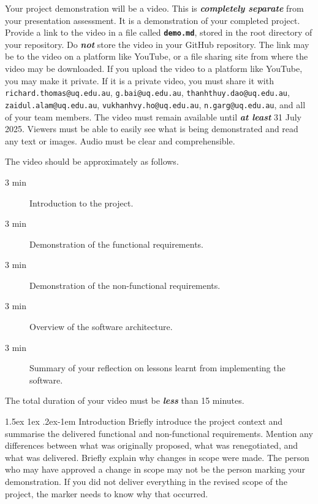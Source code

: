 \documentclass{csse4400}
\makeatletter
\renewcommand{\paragraph}{%
  \@startsection{paragraph}{4}%
  {\z@}{1.5ex \@plus 1ex \@minus .2ex}{-1em}%
  {\normalfont\normalsize\bfseries}%
}
\makeatother
\begin{document}
Your project demonstration will be a video.
This is \textbf{\textit{completely separate}} from your presentation assessment.
It is a demonstration of your completed project.
Provide a link to the video in a file called \textbf{\texttt{demo.md}}, stored in the root directory of your repository.
Do \textbf{\textit{not}} store the video in your GitHub repository.
The link may be to the video on a platform like YouTube, or a file sharing site from where the video may be downloaded.
If you upload the video to a platform like YouTube, you may make it private.
If it is a private video, you must share it with \texttt{richard.thomas@uq.edu.au},
\texttt{g.bai@uq.edu.au}, \texttt{thanhthuy.dao@uq.edu.au}, \\\texttt{zaidul.alam@uq.edu.au},
\texttt{vukhanhvy.ho@uq.edu.au}, \texttt{n.garg@uq.edu.au}, and all of your team members.
The video must remain available until \textbf{\textit{at least}} 31 July 2025.
Viewers must be able to easily see what is being demonstrated and read any text or images.
Audio must be clear and comprehensible.

\begin{samepage}
The video  should be approximately as follows.

\begin{description}
    \item[3 min] Introduction to the project.
    \item[3 min] Demonstration of the functional requirements.
    \item[3 min] Demonstration of the non-functional requirements.
    \item[3 min] Overview of the software architecture.
    \item[3 min] Summary of your reflection on lessons learnt from implementing the software.
\end{description}
\end{samepage}

\noindent
The total duration of your video must be \textbf{\emph{less}} than 15 minutes.

\paragraph{Introduction} Briefly introduce the project context and summarise the delivered functional and non-functional requirements.
Mention any differences between what was originally proposed, what was renegotiated, and what was delivered.
Briefly explain why changes in scope were made.
The person who may have approved a change in scope may not be the person marking your demonstration.
If you did not deliver everything in the revised scope of the project, the marker needs to know why that occurred.
\end{document}
